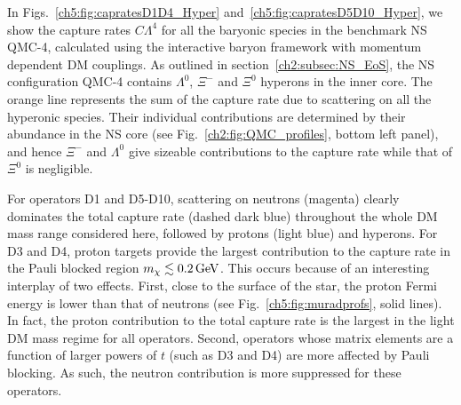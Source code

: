 In Figs.~\ref{ch5:fig:capratesD1D4_Hyper} and~\ref{ch5:fig:capratesD5D10_Hyper}, we show the capture rates $C \Lambda^4$ for all the baryonic species in the benchmark NS QMC-4, calculated using the interactive baryon framework with momentum dependent DM couplings. As outlined in section~\ref{ch2:subsec:NS_EoS}, the NS configuration QMC-4 contains $\Lambda^0$, $\Xi^-$ and $\Xi^0$ hyperons in the inner core.  
The orange line represents the sum of the capture rate due to scattering on all the hyperonic species. Their individual contributions are determined by their abundance in the NS core (see Fig.~\ref{ch2:fig:QMC_profiles}, bottom left panel), and hence $\Xi^-$ and $\Lambda^0$ give sizeable contributions to the capture rate while that of $\Xi^0$ is negligible. 


For operators D1 and D5-D10, scattering on neutrons (magenta) clearly dominates the total capture rate (dashed dark blue) throughout the whole DM mass range considered here, followed by protons (light blue) and hyperons. 
For D3 and D4, proton targets provide the largest contribution to the capture rate in the Pauli blocked region $m_\chi\lesssim0.2{\rm \,GeV}$. This occurs because of an interesting interplay of two effects. First, close to the surface of the star, the proton Fermi energy is lower than that of neutrons (see Fig.~\ref{ch5:fig:muradprofs}, solid lines). In fact, the proton contribution to the total capture rate is the largest in the light DM mass regime for all operators. 
Second, operators whose matrix elements are a function of larger powers of $t$ (such as D3 and D4) are more affected by Pauli blocking. As such, the neutron contribution is more suppressed for these operators. 

